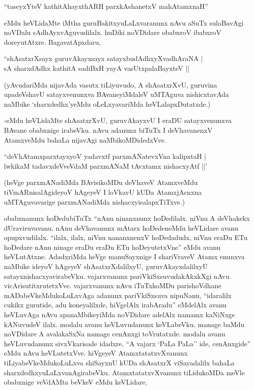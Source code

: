 \begin{shloka}
``taseyxYteV kathitAhayxthARH parxkAshanetxV mahAtamxnaH''
\end{shloka}

eMdu heVLidaMte iMtha guruBakitxyuLaLxvaranunx nAvu aSuTx sulaBavAgi noVDalu sAdhAyxvAguvudilalx. huDiki noVDidare obabxroV ibabxroV doreyutAtxre. BagavatApxdaru,

\begin{shloka}
``shAsatxrXsayx guruvAkayxsayx satayxbudAdhxyXvadhAraNA |\\
sA sharxdAdhx kathitA sadiBxH yayA vasUtxpalaBayxteV ||
\end{shloka}

(yAvudariMda nijavAda vasutx tiLiyuvudo, A shAsatxrXvU, guruvina upadeVshavU satayxvenunxva BAvaneyiMdaleV uMTAguva nishicxtavAda naMbike `sharxdedhx'yeMdu oLeLxyavariMda heVLalapxDutatxde.)

-eMdu heVLidaMte shAsatxrXvU, guruvAkayxvU I eraDU satayxvenunxva BAvane obabxnige irabeVku. nAvu adanunx biTuTx I deVhavanenxV AtamxveMdu bahaLa nijavAgi naMbikoMDidedxVve.

\begin{shloka}
``deVhAtamxparxtayxyoV yadavxtf parxmANatevxVna kalipxtaH |\\
lwkikaM tadavxdeVveVdaM parxmANaM tAvxtamx nishacxyAtf ||'
\end{shloka}

(heVge parxmANadiMda BAvisikoMDu deVhaveV AtamxveMdu tiVmARnisalAgideyoV hAgeyeV I loVkavU kUDa AtamxjAcnxna uMTAguvavarige parxmANadiMda nishacxyisalapxTiTxve.)

obabxnanunx hoDedubiTuTx ``nAnu ninanxnunx hoDedilalx. niVnu A deVhakekx dUraviruvavanu. nAnu deVhavanunx mAtarx hoDedeneMdu heVLidare avanu opupxvudilalx. ``ilalx, ilalx, niVnu nananxnenxV hoDedadudx, niVnu eraDu ETu hoDedare nAnu ninage eraDu eraDu ETu hoDeyutetxVne'' eMdu avanu heVLutAtxne. AdadxriMda heVge manuSayxnige I shariVraveV Atamx enunxva naMbike ideyoV hAgeyeV shAsatxrXdalilxyU, guruvAkayxdalilxyU satayxnishacxyavirabeVku. vajarxvanunx pariVkiSxsuvudakAkxkXgi nAvu vicArisutitxrutetxVve. vajarxvanunx nAvu iTuTxkoMDu parishoVdhane mADabeVkeMdukoLuLxvAga adanunx pariVkiSxsuva nipuNanu, ``idaralilx cukikx gurutide, adu koneyalilxde, hiVgelAlx irabAradu'' eMdelAlx avanu heVLuvAga nAvu apanaMbikeyiMda noVDidare adelAlx namamx kaNiNxge kANuvudeV ilalx. modalu avanu heVLuvudanunx keVLabeVku. manage baMdu noVDidare A avalakaSxNa namage cenAnxgi toVrutatxde. modalu avanu heVLuvudanunx sivxVkarisade idadxre, ``A vajarx `PaLa PaLa'' ide, cenAnxgide'' eMdu nAvu heVLutetxVve. hiVgeyeV AtamxtatatxvXvanunx tiLiyabeVkeMdukoLuLxva shiSayxnU kUDa shAsatxrX viSayadalilx bahaLa sharxdedhxyuLaLxvanAgirabeVku. AtamxtatatxvXvanunx tiLidukoMDa meVle obabxnige veVdAMta beVkeV eMdu keVLidare,

